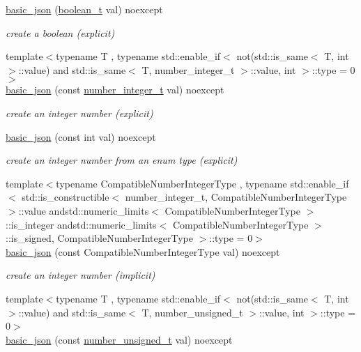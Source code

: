 \begin{DoxyCompactItemize}
\hyperlink{classnlohmann_1_1basic__json_aac36af84d907b5c3e469af889661620a}{basic\-\_\-json} (\hyperlink{classnlohmann_1_1basic__json_af3bc3e83aa162d7ba4df16a949872723}{boolean\-\_\-t} val) noexcept
\begin{DoxyCompactList}\small\item\em create a boolean (explicit) \end{DoxyCompactList}\item 
{\footnotesize template$<$typename T , typename std\-::enable\-\_\-if$<$ not(std\-::is\-\_\-same$<$ T, int $>$\-::value) and std\-::is\-\_\-same$<$ T, number\-\_\-integer\-\_\-t $>$\-::value, int $>$\-::type  = 0$>$ }\\\hyperlink{classnlohmann_1_1basic__json_a0d838bc7ffca6017f51167e0a8ffd9b6}{basic\-\_\-json} (const \hyperlink{classnlohmann_1_1basic__json_ac4b10b2364f26ce47bdb9a413ff04a59}{number\-\_\-integer\-\_\-t} val) noexcept
\begin{DoxyCompactList}\small\item\em create an integer number (explicit) \end{DoxyCompactList}\item 
\hyperlink{classnlohmann_1_1basic__json_a70ae1f0747f5b7a89979512866474f1a}{basic\-\_\-json} (const int val) noexcept
\begin{DoxyCompactList}\small\item\em create an integer number from an enum type (explicit) \end{DoxyCompactList}\item 
{\footnotesize template$<$typename Compatible\-Number\-Integer\-Type , typename std\-::enable\-\_\-if$<$ std\-::is\-\_\-constructible$<$ number\-\_\-integer\-\_\-t, Compatible\-Number\-Integer\-Type $>$\-::value andstd\-::numeric\-\_\-limits$<$ Compatible\-Number\-Integer\-Type $>$\-::is\-\_\-integer andstd\-::numeric\-\_\-limits$<$ Compatible\-Number\-Integer\-Type $>$\-::is\-\_\-signed, Compatible\-Number\-Integer\-Type $>$\-::type  = 0$>$ }\\\hyperlink{classnlohmann_1_1basic__json_ad2eddc2c13ab084f067eaba65d381ad2}{basic\-\_\-json} (const Compatible\-Number\-Integer\-Type val) noexcept
\begin{DoxyCompactList}\small\item\em create an integer number (implicit) \end{DoxyCompactList}\item 
{\footnotesize template$<$typename T , typename std\-::enable\-\_\-if$<$ not(std\-::is\-\_\-same$<$ T, int $>$\-::value) and std\-::is\-\_\-same$<$ T, number\-\_\-unsigned\-\_\-t $>$\-::value, int $>$\-::type  = 0$>$ }\\\hyperlink{classnlohmann_1_1basic__json_a85b09b03916d3d1e73373f49cdd4136d}{basic\-\_\-json} (const \hyperlink{classnlohmann_1_1basic__json_a60a04166c122072ab11eaf9845d9cd1d}{number\-\_\-unsigned\-\_\-t} val) noexcept

\end{DoxyCompactItemize}
